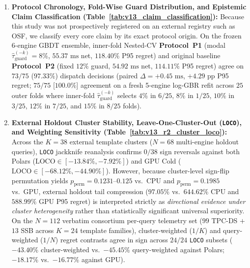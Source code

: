 \documentclass[10pt,a4paper]{article}
\begin{document}
\begin{enumerate}[leftmargin=1.4em,itemsep=1.0pt]
    \item \textbf{Protocol Chronology, Fold-Wise Guard Distribution, and Epistemic Claim Classification (Table~\ref{tab:v13_claim_classification}):} Because this study was not prospectively registered on an external registry such as OSF, we classify every core claim by its exact protocol origin. On the frozen 6-engine GBDT ensemble, inner-fold Nested-CV \textbf{Protocol~P1} (modal $\hat{\tau}_{\text{guard}}^{(-k)}=8\%$, $55.37\text{ ms}$ net, $118.40\%$ P95 regret) and original baseline \textbf{Protocol~P2} (fixed $12\%$ guard, $54.92\text{ ms}$ net, $114.11\%$ P95 regret) agree on $73/75$ ($97.33\%$) dispatch decisions (paired $\Delta = +0.45\text{ ms}$, $+4.29\text{ pp}$ P95 regret; $75/75$ [$100.0\%$] agreement on a fresh 5-engine log-GBR refit across $25$ outer folds where inner-fold $\hat{\tau}_{\text{guard}}^{(-k)}$ selects $4\%$ in $6/25$, $8\%$ in $1/25$, $10\%$ in $3/25$, $12\%$ in $7/25$, and $15\%$ in $8/25$ folds).
    \item \textbf{External Holdout Cluster Stability, Leave-One-Cluster-Out (\texttt{LOCO}), and Weighting Sensitivity (Table~\ref{tab:v13_r2_cluster_loco}):} Across the $K=38$ external template clusters ($N=68$ multi-engine holdout queries), \texttt{LOCO} jackknife reanalysis confirms $0/38$ sign reversals against both Polars ($\text{LOCO}\in[-13.84\%, -7.92\%]$) and GPU Cold ($\text{LOCO}\in[-68.12\%, -44.90\%]$). However, because cluster-level sign-flip permutation yields $p_{\text{perm}}=0.1231\text{--}0.125$ vs.\ CPU and $p_{\text{perm}}=0.1985$ vs.\ GPU, external holdout tail compression ($97.05\%$ vs.\ $644.62\%$ CPU and $588.99\%$ GPU P95 regret) is interpreted strictly as \emph{directional evidence under cluster heterogeneity} rather than statistically significant universal superiority. On the $N=112$ verbatim consortium per-query telemetry set ($99$ TPC-DS $+$ $13$ SSB across $K=24$ template families), cluster-weighted ($1/K$) and query-weighted ($1/N$) regret contrasts agree in sign across $24/24$ \texttt{LOCO} subsets ($-43.40\%$ cluster-weighted vs.\ $-45.45\%$ query-weighted against Polars; $-18.17\%$ vs.\ $-16.77\%$ against GPU).

\end{enumerate}
\end{document}
